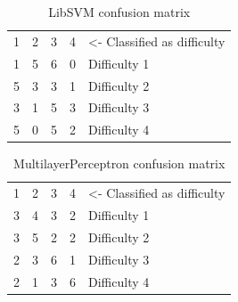 \documentclass[11pt,leqno,a4paper]{report} %
\begin{document}

\begin{table}[h]
\caption {LibSVM confusion matrix} 
\center
\begin{tabular}{ccccl}
\multicolumn{1}{l}{1} & \multicolumn{1}{l}{2} & \multicolumn{1}{l}{3} & \multicolumn{1}{l}{4} & \small{\textless- Classified as difficulty} \\ \cline{1-4}
1                          & 5                          & 6                          & \multicolumn{1}{c|}{0}     & Difficulty 1                    \\
5                          & 3                          & 3                          & \multicolumn{1}{c|}{1}     & Difficulty 2                    \\
3                          & 1                          & 5                          & \multicolumn{1}{c|}{3}     & Difficulty 3                    \\
5                          & 0                          & 5                          & \multicolumn{1}{c|}{2}     & Difficulty 4                   
\end{tabular}
\end{table}


\begin{table}[h]
\caption {MultilayerPerceptron confusion matrix} 
\center
\begin{tabular}{ccccl}
\multicolumn{1}{l}{1} & \multicolumn{1}{l}{2} & \multicolumn{1}{l}{3} & \multicolumn{1}{l}{4} & \small{\textless- Classified as difficulty} \\ \cline{1-4}
3                          & 4                          & 3                          & \multicolumn{1}{c|}{2}     & Difficulty 1                    \\
3                          & 5                          & 2                          & \multicolumn{1}{c|}{2}     & Difficulty 2                    \\
2                          & 3                          & 6                          & \multicolumn{1}{c|}{1}     & Difficulty 3                    \\
2                          & 1                          & 3                          & \multicolumn{1}{c|}{6}     & Difficulty 4                   
\end{tabular}
\end{table}
\end{document}
